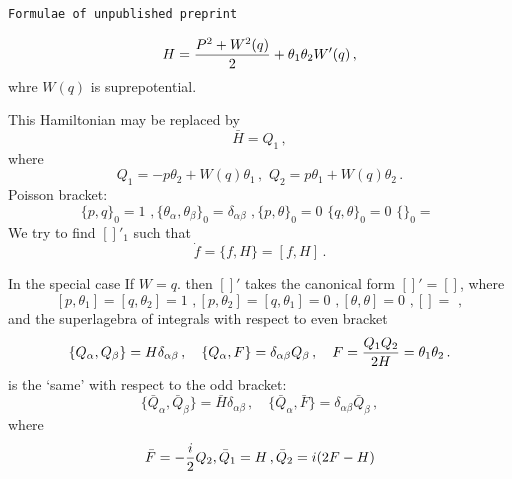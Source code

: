  

\baselineskip=14pt
\def\vare {\varepsilon}
\def\t {\tilde}
\def\a {\alpha}
\def\K {{\bf K}}
\def\N {{\bf N}}
\def\C {{\cal C}}
\def\L {{\cal L}}
\def\E {{\cal E}}
\def\s {{\sigma}}
\def\S {{\Sigma}}
\def\p{\partial}
\def\vare{{\varepsilon}}
\def\Q {{\bf Q}}
\def\D {{\cal D}}
\def\G {{\Gamma}}
\def\Z {{\bf Z}}
\def\R  {{\bf R}}
\def\l {\lambda}
\def\ll {{\bf l}}
\def\degree {{\bf {\rm degree}\,\,}}
\def \finish {${\,\,\vrule height1mm depth2mm width 8pt}$}
\def \m {\medskip}
\def\p {\partial}
\def\r {{\bf r}}
\def\pt {{\bf p}}
\def\v {{\bf v}}
\def\n {{\bf n}}
\def\t {{\bf t}}
\def\b {{\bf b}}
\def\c {{\bf c }}
\def\e{{\bf e}}
\def\f{{\bf f}}
\def\ac {{\bf a}}
\def \X   {{\bf X}}
\def \Y   {{\bf Y}}
\def \x   {{\bf x}}
\def \y   {{\bf y}}
\def\w {{\omega}}
\def \Tr  {{\rm Tr\,}}
\def\dim {{\rm dim\,\,}}
\def\t {{\tilde}} 
\def\dist {{\hbox{\tt "distance"}}}
\def  \dim {{\rm dim\,}}
\def  \Im  {{\rm Im\,}}
\def  \ker {{\rm ker\,}}

\centerline {\tt Formulae of unpublished preprint}
    $$
H={P^2+W^2(q)\over 2}+\theta_1\theta_2W'(q)\,,
    $$
whre $W(q)$ is suprepotential.

This Hamiltonian may be replaced by
      $$
    \bar {H}=Q_1\,,
      $$
where
      $$
Q_1=-p\theta_2+W(q)\theta_1\,,\,\,
Q_2=p\theta_1+W(q)\theta_2\,.
          $$
Poisson bracket:
     $$
\{p,q\}_0=1\,\,,
\{\theta_\a,\theta_\beta\}_0=\delta_{\a\beta}\,\,,
\{p,\theta\}_0=0\,\,
\{q,\theta\}_0=0\,\,
\{\}_0=\,\,
     $$
   We try to find $[]'_1$ such that
    $$
    \dot f=\{f,H\}=[f,H]\,.
    $$ 

In the special case If $W=q$. then $[]'$ 
takes the canonical form $[]'=[]$,
where
     $$
[p,\theta_1]=
[q,\theta_2]=1\,\,,
[p,\theta_2]=
[q,\theta_1]=0\,\,,
[\theta,\theta]=0\,\,,
[]=\,\,,
     $$
and the superlagebra of integrals with respect to even
bracket
        $$
\{Q_\a,Q_\beta\}=H\delta_{\a\beta}\,,\quad
\{Q_\a,F\}=\delta_{\a\beta}Q_\beta\,,\quad
      F={Q_1Q_2\over 2H}=\theta_1\theta_2\,.
        $$
is the `same' with respect to the odd bracket:
        $$
\{\bar {Q}_\a,\bar {Q}_\beta\}=\bar {H}\delta_{\a\beta}\,,\quad
\{\bar {Q}_\a,\bar {F}\}=\delta_{\a\beta}\bar {Q}_\beta\,,
             $$
where     
              $$
     \bar {F}=-{i\over 2}Q_2, \bar {Q}_1=H\,, 
 \bar {Q}_2=i(2F-H)
        $$
\bye


